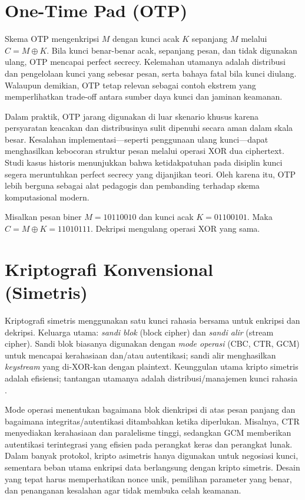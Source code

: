 \documentclass[../main.tex]{subfiles}
\begin{document}
\section{One-Time Pad (OTP)}
Skema OTP mengenkripsi \(M\) dengan kunci acak \(K\) sepanjang \(M\) melalui \(C=M\oplus K\). Bila kunci benar-benar acak, sepanjang pesan, dan tidak digunakan ulang, OTP mencapai perfect secrecy. Kelemahan utamanya adalah distribusi dan pengelolaan kunci yang sebesar pesan, serta bahaya fatal bila kunci diulang. Walaupun demikian, OTP tetap relevan sebagai contoh ekstrem yang memperlihatkan trade-off antara sumber daya kunci dan jaminan keamanan.

Dalam praktik, OTP jarang digunakan di luar skenario khusus karena persyaratan keacakan dan distribusinya sulit dipenuhi secara aman dalam skala besar. Kesalahan implementasi—seperti penggunaan ulang kunci—dapat menghasilkan kebocoran struktur pesan melalui operasi XOR dua ciphertext. Studi kasus historis menunjukkan bahwa ketidakpatuhan pada disiplin kunci segera meruntuhkan perfect secrecy yang dijanjikan teori. Oleh karena itu, OTP lebih berguna sebagai alat pedagogis dan pembanding terhadap skema komputasional modern.

\begin{example}
Misalkan pesan biner \(M=10110010\) dan kunci acak \(K=01100101\). Maka \(C=M\oplus K=11010111\). Dekripsi mengulang operasi XOR yang sama.
\end{example}

\section{Kriptografi Konvensional (Simetris)}
Kriptografi simetris menggunakan satu kunci rahasia bersama untuk enkripsi dan dekripsi. Keluarga utama: \emph{sandi blok} (block cipher) dan \emph{sandi alir} (stream cipher). Sandi blok biasanya digunakan dengan \emph{mode operasi} (CBC, CTR, GCM) untuk mencapai kerahasiaan dan/atau autentikasi; sandi alir menghasilkan \emph{keystream} yang di-XOR-kan dengan plaintext. Keunggulan utama kripto simetris adalah efisiensi; tantangan utamanya adalah distribusi/manajemen kunci rahasia \citep{stallings,menezes}.

Mode operasi menentukan bagaimana blok dienkripsi di atas pesan panjang dan bagaimana integritas/autentikasi ditambahkan ketika diperlukan. Misalnya, CTR menyediakan kerahasiaan dan paralelisme tinggi, sedangkan GCM memberikan autentikasi terintegrasi yang efisien pada perangkat keras dan perangkat lunak. Dalam banyak protokol, kripto asimetris hanya digunakan untuk negosiasi kunci, sementara beban utama enkripsi data berlangsung dengan kripto simetris. Desain yang tepat harus memperhatikan nonce unik, pemilihan parameter yang benar, dan penanganan kesalahan agar tidak membuka celah keamanan.
\end{document}

